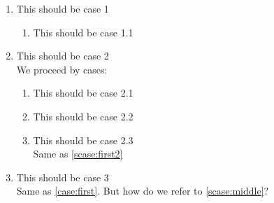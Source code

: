 \documentclass{article}
\begin{document}
\begin{enumerate}[label*={\bf Case} \arabic*]
  \item This should be case 1\label{case:first}

  \begin{enumerate}[label*=.\arabic*]
    \item This should be case 1.1 \label{scase:first1}
  \end{enumerate}

  \item This should be case 2\\
    We proceed by cases:
    \begin{enumerate}[label*=.\arabic*]
    \item This should be case 2.1\label{scase:first2}

    \item This should be case 2.2\label{scase:middle}

    \item This should be case 2.3\\
      Same as \ref{scase:first2}
    \end{enumerate}

  \item This should be case 3\\
    Same as \ref{case:first}. But how do we refer to \ref{scase:middle}?
\end{enumerate}
\end{document}
